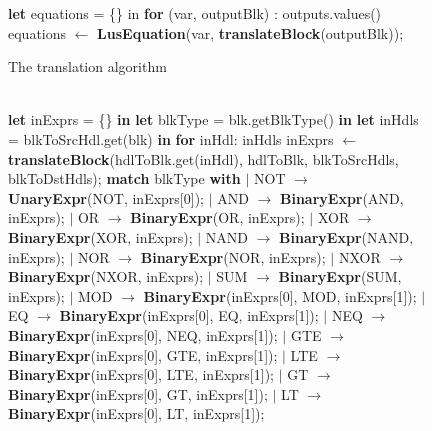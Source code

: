 \documentclass{article}
\begin{document}
\begin{figure}
\begin{algorithmic}
\State \textbf{let} equations = \{\} in
\State \textbf{for} (var, outputBlk) : outputs.values()
\State {\ \ \ \ } equations $\leftarrow$ \textbf{LusEquation}(var, \textbf{translateBlock}(outputBlk));

\EndFunction
\end{algorithmic}
\caption{The translation algorithm}
\end{figure}

\begin{figure}
\begin{algorithmic}
\\
\State \textbf{let} inExprs = \{\} \textbf{in}
\State \textbf{let} blkType = blk.getBlkType() \textbf{in}
\State \textbf{let} inHdls = blkToSrcHdl.get(blk) \textbf{in}
\State \textbf{for} inHdl: inHdls
\State {\ \ \ \ } inExprs $\leftarrow$ \textbf{translateBlock}(hdlToBlk.get(inHdl), hdlToBlk, blkToSrcHdls, blkToDstHdls);
\State \textbf{match} blkType \textbf{with}
\State $\mid$ NOT $\rightarrow$ \textbf{UnaryExpr}(NOT, inExprs[0]);
\State $\mid$ AND $\rightarrow$ \textbf{BinaryExpr}(AND, inExprs);
\State $\mid$ OR $\rightarrow$ \textbf{BinaryExpr}(OR, inExprs);
\State $\mid$ XOR $\rightarrow$ \textbf{BinaryExpr}(XOR, inExprs);
\State $\mid$ NAND $\rightarrow$ \textbf{BinaryExpr}(NAND, inExprs);
\State $\mid$ NOR $\rightarrow$ \textbf{BinaryExpr}(NOR, inExprs);
\State $\mid$ NXOR $\rightarrow$ \textbf{BinaryExpr}(NXOR, inExprs);
\State $\mid$ SUM $\rightarrow$ \textbf{BinaryExpr}(SUM, inExprs);
\State $\mid$ MOD $\rightarrow$ \textbf{BinaryExpr}(inExprs[0], MOD, inExprs[1]);
\State $\mid$ EQ $\rightarrow$ \textbf{BinaryExpr}(inExprs[0], EQ, inExprs[1]);
\State $\mid$ NEQ $\rightarrow$ \textbf{BinaryExpr}(inExprs[0], NEQ, inExprs[1]);
\State $\mid$ GTE $\rightarrow$ \textbf{BinaryExpr}(inExprs[0], GTE, inExprs[1]);
\State $\mid$ LTE $\rightarrow$ \textbf{BinaryExpr}(inExprs[0], LTE, inExprs[1]);
\State $\mid$ GT $\rightarrow$ \textbf{BinaryExpr}(inExprs[0], GT, inExprs[1]);
\State $\mid$ LT $\rightarrow$ \textbf{BinaryExpr}(inExprs[0], LT, inExprs[1]);


\end{algorithmic}
\end{figure}
\end{document}
